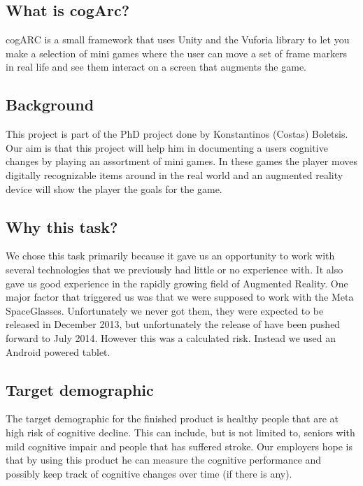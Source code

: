 \subsection{What is cogArc?}
\label{subsec:what_is_cogarc}
cogARC is a small framework that uses Unity and the Vuforia library to let you make a selection of mini games where the user can move a set of frame markers in real life and see them interact on a screen that augments the game.

\subsection{Background}
\label{subsec:background}
This project is part of the PhD project done by Konstantinos (Costas) Boletsis. Our aim is that this project will help him in documenting a users cognitive changes by playing an assortment of mini games. In these games the player moves digitally recognizable items around in the real world and an augmented reality device will show the player the goals for the game. 

\subsection{Why this task?}
\label{subsec:why_this_task}
We chose this task primarily because it gave us an opportunity to work with several technologies that we previously had little or no experience with.
It also gave us good experience in the rapidly growing field of \gls{Augmented Reality}. 
One major factor that triggered us was that we were supposed to work with the 
\gls{Meta SpaceGlasses}. Unfortunately we never got them,  they were expected to be released in December
 2013, but unfortunately the release of have been pushed forward to July 2014.
 However this was a calculated risk. Instead we used an Android powered tablet.

\subsection{Target demographic}
\label{subsec:target_demographic}
The target demographic for the finished product is healthy people that are at high risk of cognitive decline. This can include, but is not limited to, seniors with mild cognitive impair and people that has suffered stroke.
Our employers hope is that by using this product he can measure the cognitive performance and possibly keep track of cognitive changes over time (if there is any).

